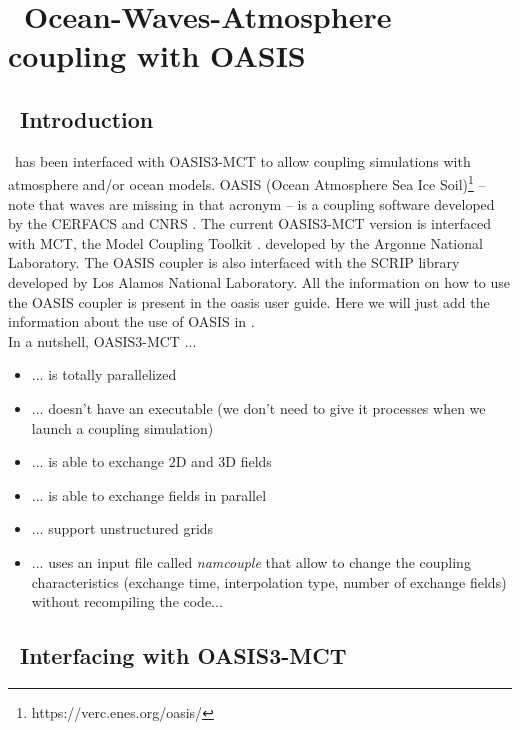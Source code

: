 \pagestyle{myheadings} \setcounter{page}{1} \setcounter{footnote}{0}

\section{~Ocean-Waves-Atmosphere coupling with OASIS} \label{app:coupling}
\newcounters 

\vssub
\subsection{~Introduction} \label{sec:couplingA}
\vssub

\ws\ has been interfaced with OASIS3-MCT to allow coupling simulations with atmosphere and/or ocean models.
OASIS (Ocean Atmosphere Sea Ice Soil)\footnote{https://verc.enes.org/oasis/} -- note that waves are missing in that acronym -- is a coupling software developed by the CERFACS and CNRS \citep{art:VAL13}.
The current OASIS3-MCT version is interfaced with MCT, the Model Coupling Toolkit \citep{art:LJO05,art:JLO05}.
developed by the Argonne National Laboratory.
The OASIS coupler is also interfaced with the SCRIP library developed by Los Alamos National Laboratory. All the information on how to use the OASIS coupler is present in the oasis user guide. Here we will just add the information about the use of OASIS in \ws.\\

In a nutshell, OASIS3-MCT ...

\begin{itemize}
  \item ... is totally parallelized
  \item ... doesn't have an executable (we don't need to give it processes when we launch a coupling simulation)
  \item ... is able to exchange 2D and 3D fields
  \item ... is able to exchange fields in parallel
  \item ... support unstructured grids
  \item ... uses an input file called \textit{namcouple} that allow to change the coupling characteristics (exchange time, interpolation type, number of exchange fields) without recompiling the code...
\end{itemize}

\vssub
\subsection{~Interfacing with OASIS3-MCT} \label{sec:couplingB}
\vssub

